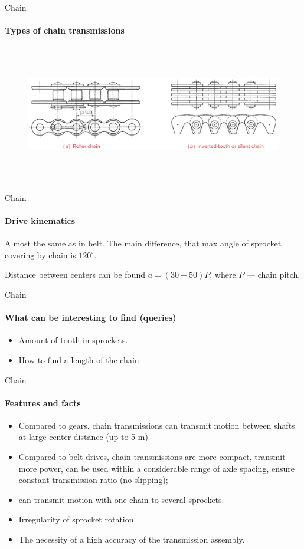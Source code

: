 \documentclass[aspectratio=169]{beamer}
\begin{document}
\begin{frame}[t]{Chain}
    \framesubtitle{Types of chain transmissions}
    \begin{figure}[H]
        \centering\includegraphics[height=6cm,width=1\textwidth,keepaspectratio]{chain_types.png}
        \label{fig:chain_types.png}
    \end{figure}
\end{frame}

\begin{frame}[t]{Chain}
    \framesubtitle{Drive kinematics}
    Almost the same as in belt. The main difference, that max angle of sprocket covering by chain is $120^\circ$.

    Distance between centers can be found $a = (30 - 50)P$, where $P$ --- chain pitch.
\end{frame}


\begin{frame}[t]{Chain}
    \framesubtitle{What can be interesting to find (queries)}
    \begin{itemize}
        \item Amount of tooth in sprockets.
        \item How to find a length of the chain 
    \end{itemize}
\end{frame}

\begin{frame}[t]{Chain}
    \framesubtitle{Features and facts}
    \begin{itemize}
        \item Compared to gears, chain transmissions can transmit motion between shafts at large center distance (up to 5 m)
        \item Compared to belt drives, chain transmissions are more compact, transmit more power, can be used within a considerable range of axle spacing, ensure constant transmission ratio (no slipping); 
        \item can transmit motion with one chain to several sprockets. 
        \item Irregularity of sprocket rotation.
        \item The necessity of a high accuracy of the transmission assembly.
    \end{itemize}
\end{frame}
\end{document}
